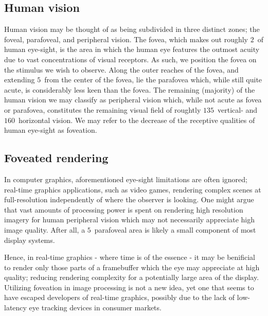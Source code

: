 \subsection{Human vision}
Human vision may be thought of as being subdivided in three distinct zones; the foveal, parafoveal, and peripheral vision\cite{rayner98}.
The fovea, which makes out roughly $2$\degree\ of human eye-sight, is the area in which the human eye features the outmost acuity due to vast concentrations of visual receptors.
As such, we position the fovea on the stimulus we wish to observe.
Along the outer reaches of the fovea, and extending $5$\degree\ from the center of the fovea, lie the parafovea which, while still quite acute, is considerably less keen than the fovea.
The remaining (majority) of the human vision we may classify as peripheral vision which, while not acute as fovea or parafovea, constitutes the remaining visual field of roughtly $135$\degree\ vertical- and $160$\degree\ horizontal vision\cite{guenter12}.
We may refer to the decrease of the receptive qualities of human eye-sight as foveation.

\subsection{Foveated rendering}
In computer graphics, aforementioned eye-sight limitations are often ignored; real-time graphics applications, such as video games, rendering complex scenes at full-resolution independently of where the observer is looking.
One might argue that vast amounts of processing power is spent on rendering high resolution imagery for human peripheral vision which may not necessarily appreciate high image quality.
After all, a $5$\degree\ parafoveal area is likely a small component of most display systems.

Hence, in real-time graphics - where time is of the essence - it may be benificial to render only those parts of a framebuffer which the eye may appreciate at high quality; reducing rendering complexity for a potentially large area of the display.
Utilizing foveation in image processing is not a new idea\cite{levoy90}, yet one that seems to have escaped developers of real-time graphics, possibly due to the lack of low-latency eye tracking devices in consumer markets.
